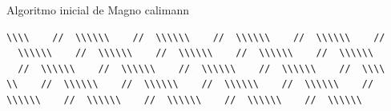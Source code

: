 \begin{example}{Algoritmo inicial de Magno calimann}
\begin{verbatim}
\\\\    //  \\\\\\    //  \\\\\\    //  \\\\\\    //  \\\\\\    //
  \\\\\\    //  \\\\\\    //  \\\\\\    //  \\\\\\    //  \\\\\\  
  //  \\\\\\    //  \\\\\\    //  \\\\\\    //  \\\\\\    //  \\\\
\\    //  \\\\\\    //  \\\\\\    //  \\\\\\    //  \\\\\\    //  
\\\\\\    //  \\\\\\    //  \\\\\\    //  \\\\\\    //  \\\\\\    

\end{verbatim}
\end{example}
